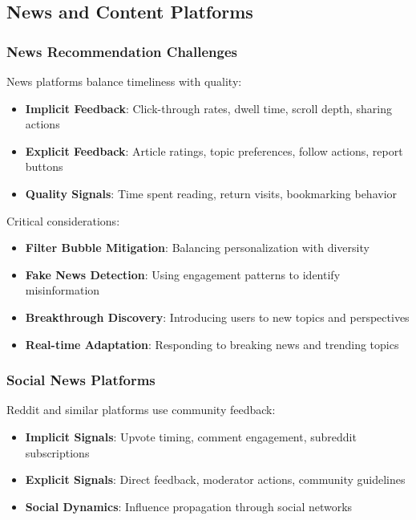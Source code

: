 \documentclass[acmsmall,review,anonymous]{acmart}
\begin{document}
\subsection{News and Content Platforms}

\subsubsection{News Recommendation Challenges}

News platforms balance timeliness with quality:

\begin{itemize}
    \item \textbf{Implicit Feedback}: Click-through rates, dwell time, scroll depth, sharing actions
    \item \textbf{Explicit Feedback}: Article ratings, topic preferences, follow actions, report buttons
    \item \textbf{Quality Signals}: Time spent reading, return visits, bookmarking behavior
\end{itemize}

Critical considerations:
\begin{itemize}
    \item \textbf{Filter Bubble Mitigation}: Balancing personalization with diversity
    \item \textbf{Fake News Detection}: Using engagement patterns to identify misinformation
    \item \textbf{Breakthrough Discovery}: Introducing users to new topics and perspectives
    \item \textbf{Real-time Adaptation}: Responding to breaking news and trending topics
\end{itemize}

\subsubsection{Social News Platforms}

Reddit and similar platforms use community feedback:

\begin{itemize}
    \item \textbf{Implicit Signals}: Upvote timing, comment engagement, subreddit subscriptions
    \item \textbf{Explicit Signals}: Direct feedback, moderator actions, community guidelines
    \item \textbf{Social Dynamics}: Influence propagation through social networks
\end{itemize}
\end{document}
